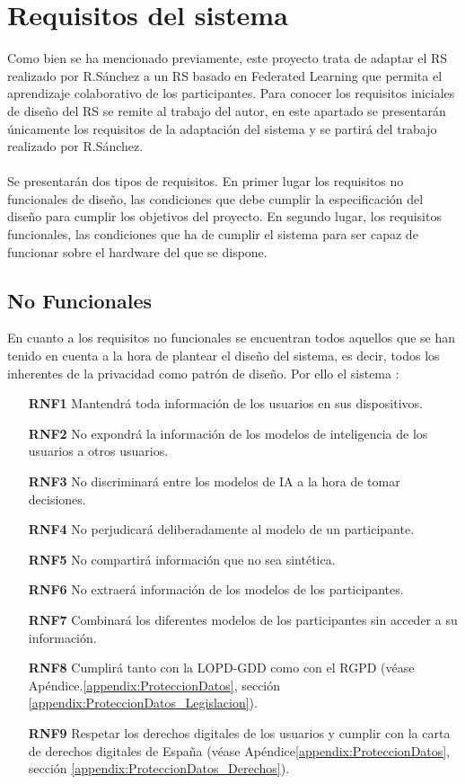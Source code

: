 \section{Requisitos del sistema}
Como bien se ha mencionado previamente, este proyecto trata de adaptar el RS realizado por R.Sánchez \autocite{sanchez-corcueraPersuasionbasedRecommenderSystem2020} a un RS basado en Federated Learning que permita el aprendizaje colaborativo de los participantes. Para conocer los requisitos iniciales de diseño del RS se remite al trabajo del autor, en este apartado se presentarán únicamente los requisitos de la adaptación del sistema y se partirá del trabajo realizado por R.Sánchez. 
\\ \\
Se presentarán dos tipos de requisitos. En primer lugar los requisitos no funcionales de diseño, las condiciones que debe cumplir la especificación del diseño para cumplir los objetivos del proyecto. En segundo lugar, los requisitos funcionales, las condiciones que ha de cumplir el sistema para ser capaz de funcionar sobre el hardware del que se dispone.

\subsection{No Funcionales}
En cuanto a los requisitos no funcionales se encuentran todos aquellos que se han tenido en cuenta a la hora de plantear el diseño del sistema, es decir, todos los inherentes de la privacidad como patrón de diseño. Por ello el sistema :
\begin{itemize}
    \item [\textbf{RNF1}] Mantendrá toda información de los usuarios en sus dispositivos.
    \item [\textbf{RNF2}] No expondrá la información de los modelos de inteligencia de los usuarios a otros usuarios.
    \item [\textbf{RNF3}] No discriminará entre los modelos de IA a la hora de tomar decisiones.
    \item [\textbf{RNF4}] No perjudicará deliberadamente al modelo de un participante.
    \item [\textbf{RNF5}] No compartirá información que no sea sintética.
    \item [\textbf{RNF6}] No extraerá información de los modelos de los participantes.
    \item [\textbf{RNF7}] Combinará los diferentes modelos de los participantes sin acceder a su información.
    \item [\textbf{RNF8}] Cumplirá tanto con la LOPD-GDD como con el RGPD (véase Apéndice.\ref{appendix:ProteccionDatos}, sección \ref{appendix:ProteccionDatos_Legislacion}).
    \item [\textbf{RNF9}] Respetar los derechos digitales de los usuarios y cumplir con la carta de derechos digitales de España (véase Apéndice\ref{appendix:ProteccionDatos}, sección \ref{appendix:ProteccionDatos_Derechos}).
\end{itemize}
